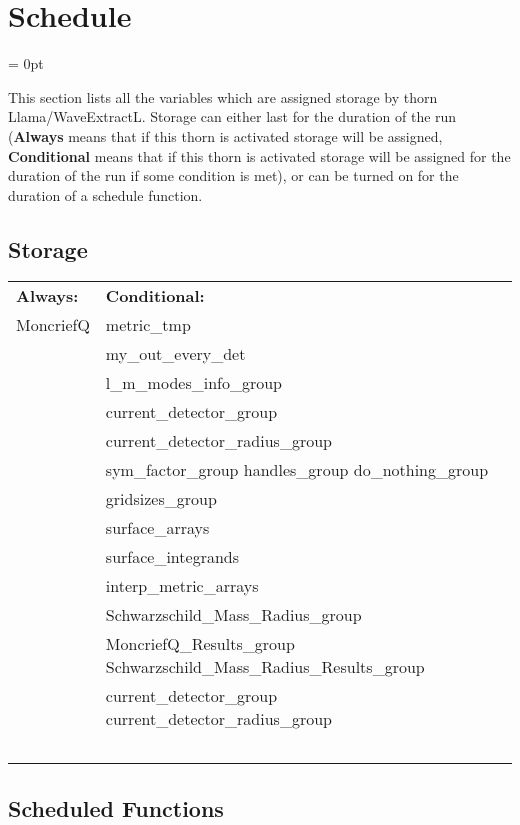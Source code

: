 
\section{Schedule} 


\parskip = 0pt


\noindent This section lists all the variables which are assigned storage by thorn Llama/WaveExtractL.  Storage can either last for the duration of the run ({\bf Always} means that if this thorn is activated storage will be assigned, {\bf Conditional} means that if this thorn is activated storage will be assigned for the duration of the run if some condition is met), or can be turned on for the duration of a schedule function.


\subsection*{Storage}

\hspace{5mm}

 \begin{tabular*}{160mm}{ll} 

{\bf Always:}& {\bf Conditional:} \\ 
 MoncriefQ &  metric\_tmp\\ 
~ &  my\_out\_every\_det\\ 
~ &  l\_m\_modes\_info\_group\\ 
~ &  current\_detector\_group\\ 
~ &  current\_detector\_radius\_group\\ 
~ &  sym\_factor\_group handles\_group do\_nothing\_group\\ 
~ &  gridsizes\_group\\ 
~ &  surface\_arrays\\ 
~ &  surface\_integrands\\ 
~ &  interp\_metric\_arrays\\ 
~ &  Schwarzschild\_Mass\_Radius\_group\\ 
~ &  MoncriefQ\_Results\_group Schwarzschild\_Mass\_Radius\_Results\_group\\ 
~ &  current\_detector\_group current\_detector\_radius\_group\\ 
~ & ~\\ 
\end{tabular*} 


\subsection*{Scheduled Functions}
\vspace{5mm}

